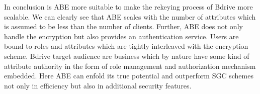 
In conclusion is \ac{ABE} more suitable to make the rekeying process of Bdrive more scalable. We can clearly see that \ac{ABE} scales with the number of attributes which is assumed to be less than the number of clients. Further, \ac{ABE} does not only handle the encryption but also provides an authentication service. Users are bound to roles and attributes which are tightly interleaved with the encryption scheme. Bdrive target audience are business which by nature have some kind of attribute authority in the form of role management and authorization mechanism embedded. Here \ac{ABE} can enfold its true potential and outperform SGC schemes not only in efficiency but also in additional security features. 